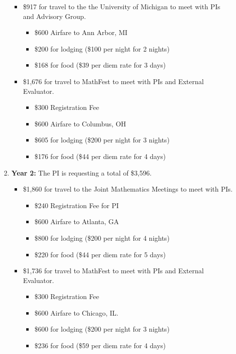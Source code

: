\documentclass[11pt]{article}
\begin{document}
\begin{enumerate}[leftmargin=*]
\begin{enumerate}
\begin{itemize}
\item \$917 for travel to the the University of Michigan to meet with PIs and Advisory Group.
\begin{itemize}
\item \$600 Airfare to Ann Arbor, MI
\item \$200 for lodging (\$100 per night for 2 nights)
\item \$168 for food (\$39 per diem rate for 3 days)
\end{itemize}

\item \$1,676 for travel to MathFest to meet with PIs and External Evaluator.
\begin{itemize}
\item \$300 Registration Fee
\item \$600 Airfare to Columbus, OH
\item \$605 for lodging (\$200 per night for 3 nights)
\item \$176 for food (\$44 per diem rate for 4 days)
\end{itemize}
\end{itemize}

\item[] \textbf{Year 2:} The PI is requesting a total of \$3,596.
\begin{itemize}
\item \$1,860 for travel to the Joint Mathematics Meetings to meet with PIs.
\begin{itemize}
\item \$240 Registration Fee for PI
\item \$600 Airfare to Atlanta, GA
\item \$800 for lodging (\$200 per night for 4 nights)
\item \$220 for food (\$44 per diem rate for 5 days)
\end{itemize}

\item \$1,736 for travel to MathFest to meet with PIs and External Evaluator.
\begin{itemize}
\item \$300 Registration Fee
\item \$600 Airfare to Chicago, IL.
\item \$600 for lodging (\$200 per night for 3 nights)
\item \$236 for food (\$59 per diem rate for 4 days)
\end{itemize}
\end{itemize}


\end{enumerate}
\end{enumerate}
\end{document}
